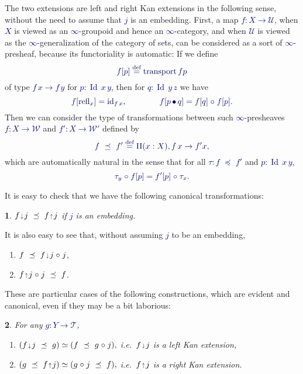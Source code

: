 \documentclass[10pt]{article}
\newcommand{\db}{\textcolor{darkblue}}
\newcommand{\m}[1]{\db{$#1$}}
\newcommand{\M}[1]{\[\db{#1}\]}
\newcommand{\pcomp}{\operatorname{\bullet}}
\newcommand{\transport}{\operatorname{transport}}
\newcommand{\id}{\operatorname{id}}
\newcommand{\comp}{\mathrel{\circ}}
\newcommand{\U}{\mathcal{U}}
\newcommand{\W}{\mathcal{W}}
\newcommand{\T}{\mathcal{T}}
\newcommand{\Id}{\operatorname{Id}}
\newcommand{\refl}{\operatorname{refl}}
\newcommand{\eqdef}{\overset{\text{def}}{=}}
\newcommand{\edown}{\scaleobj{0.7}{\,\downarrow\,}}
\newcommand{\eup}{\scaleobj{0.7}{\,\uparrow\,}}
\newcommand{\wps}{\mathrel{\,\,\preceq\,\,}}
\newtheorem{numbered}{}
\theoremstyle{definition}
\begin{document}
The two extensions are left and right Kan extensions in the following
sense, without the need to assume that \m{j} is an embedding. First, a
map \m{f:X \to \U}, when \m{X} is viewed as an \m{\infty}-groupoid and
hence an \m{\infty}-category, and when \m{\U} is viewed as the
\m{\infty}-generalization of the category of sets, can be considered
as a sort of \m{\infty}-presheaf, because its functoriality is
automatic: If we define
%
\M{f [ p ] \eqdef \transport f p}
%
of type \m{f\, x \to f\, y} for \m{p : \Id \, x \, y}, then for
\m{q : \Id \, y \, z} we have
%
\M{ f [
  \refl_x ] = \id_{f \, x}, \qquad\qquad f [p \pcomp q] = f [q] \comp f
  [p].
}
Then we can consider the type of transformations between such
\m{\infty}-presheaves \m{f : X \to \W} and \m{f' : X \to \W'} defined by
%
\M{
  f \wps f' \eqdef \Pi (x : X), f \, x \to  f' x,
}
%
which are automatically natural in the sense that for all \m{\tau: f \wps f'} and \m{p : \Id \, x \, y},
%
\M{
  \tau_y \comp f [ p ] = f' [p] \comp \tau_x.
}
%

It is easy to check that we have the following canonical transformations:
\begin{numbered}
  \m{f \edown j \wps f \eup j} if \m{j} is an embedding.
\end{numbered}
It is also easy to see that, without assuming \m{j} to be an embedding,
  \begin{enumerate}
  \item \m{f \wps f \edown j \comp j},
  \item \m{f \eup j \comp j \wps f}.
  \end{enumerate}
  These are particular cases of the following constructions, which are
  evident and canonical, even if they may be a bit
  laborious:
\begin{numbered} For any \m{g : Y \to \T},
    \begin{enumerate}
    \item \m{(f \edown j \wps g) \simeq (f \wps g \comp j),} \quad i.e.\ \m{f \edown j} is a left Kan extension,
    \item \m{(g \wps f \eup j) \simeq (g \comp j \wps f),} \quad i.e.\ \m{f \eup j} is a right Kan extension.
    \end{enumerate}
\end{numbered}
\end{document}
